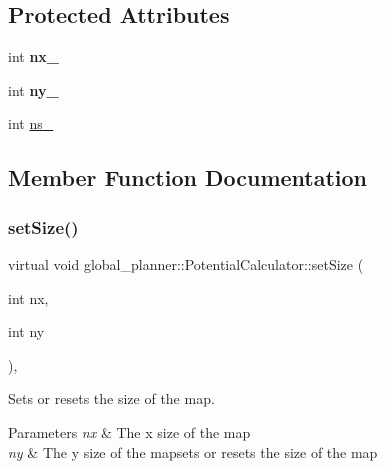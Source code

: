 \subsection*{Protected Attributes}
\begin{DoxyCompactItemize}
\item 
\mbox{\label{classglobal__planner_1_1_potential_calculator_ad5102b7868d243fef672bbe772571339}} 
int {\bfseries nx\+\_\+}
\item 
\mbox{\label{classglobal__planner_1_1_potential_calculator_a2f6e7eb5facdf52141299329b546e745}} 
int {\bfseries ny\+\_\+}
\item 
int \mbox{\hyperlink{classglobal__planner_1_1_potential_calculator_a5c62eff3a3c95db6cd6dedcb9cfb3e2a}{ns\+\_\+}}
\end{DoxyCompactItemize}


\subsection{Member Function Documentation}
\mbox{\label{classglobal__planner_1_1_potential_calculator_a9ff19259198704723eb62d515ea91e58}} 
\subsubsection{\texorpdfstring{set\+Size()}{setSize()}}
{\footnotesize\ttfamily virtual void global\+\_\+planner\+::\+Potential\+Calculator\+::set\+Size (\begin{DoxyParamCaption}\item[{int}]{nx,  }\item[{int}]{ny }\end{DoxyParamCaption})\hspace{0.3cm}{\ttfamily [inline]}, {\ttfamily [virtual]}}



Sets or resets the size of the map. 


\begin{DoxyParams}{Parameters}
{\em nx} & The x size of the map \\
\hline
{\em ny} & The y size of the mapsets or resets the size of the map \\
\hline
\end{DoxyParams}


